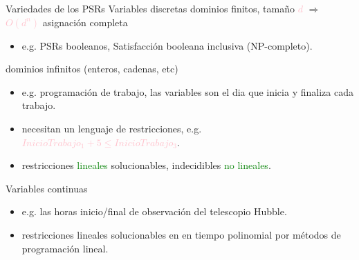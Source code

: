 \begin{frame}{Variedades de los PSRs}
Variables discretas \newline
 \newline
dominios finitos, tamaño \textcolor{pink}{$d$} $\Rightarrow$  \textcolor{pink}{$O(d^n)$}  asignación completa
\begin{itemize}
    \item e.g. PSRs booleanos, Satisfacción booleana inclusiva (NP-completo).
\end{itemize}
dominios infinitos (enteros, cadenas, etc)	
\begin{itemize}
    \item e.g. programación de trabajo, las variables son el dia que inicia y finaliza cada trabajo.
    \item necesitan un lenguaje de restricciones, e.g. \textcolor{pink}{$InicioTrabajo_1 + 5 \leq InicioTrabajo_3$}.
    \item restricciones \textcolor{green}{lineales} solucionables, indecidibles \textcolor{green}{no lineales}.
\end{itemize}
 \newline
Variables continuas
\begin{itemize}
    \item e.g. las horas inicio/final de observación del telescopio Hubble.
    \item restricciones lineales solucionables en en tiempo polinomial por métodos de programación lineal.
\end{itemize}
\end{frame}

